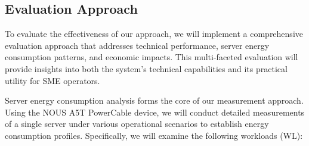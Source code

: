 \subsection{Evaluation Approach}
To evaluate the effectiveness of our approach, we will implement a comprehensive
evaluation approach that addresses technical performance, server energy
consumption patterns, and economic impacts. This multi-faceted evaluation will
provide insights into both the system's technical capabilities and its practical
utility for SME operators.

Server energy consumption analysis forms the core of our measurement approach.
Using the NOUS A5T PowerCable device, we will conduct detailed measurements of a
single server under various operational scenarios to establish energy consumption
profiles. Specifically, we will examine the following workloads (WL):

